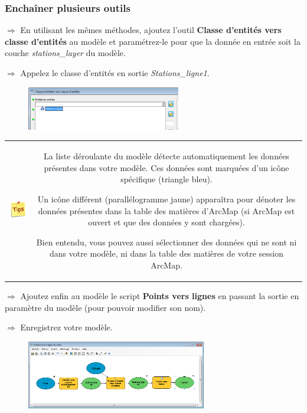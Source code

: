 \documentclass[11pt]{article}
\newcommand{\action}{$\Rightarrow$ }
\newenvironment{note}{%
	\begin{tabular}[t t]{c c}
		\includegraphics{img/tips.png}
		 &
		\begin{minipage}[c]{0.9\linewidth}
			\begin{sffamily}
}{%
			\end{sffamily}
		\end{minipage}
	\end{tabular}	
}
\begin{document}
\subsubsection{Enchaîner plusieurs outils}
\action En utilisant les mêmes méthodes, ajoutez l'outil \textbf{Classe d'entités vers classe d'entités} au modèle et paramétrez-le pour que la donnée en entrée soit la couche \textit{stations\_layer} du modèle.

\action Appelez le classe d'entités en sortie \textit{Stations\_ligne1}.

\begin{figure}[H]
	\center \includegraphics[width=0.6\textwidth]{img/td3/modelbuilder_creation-4.png}\\
\end{figure}

\begin{note}
La liste déroulante du modèle détecte automatiquement les données présentes dans votre modèle. Ces données sont marquées d'un icône spécifique (triangle bleu). 

Un icône différent (parallélogramme jaune) apparaîtra pour dénoter les données présentes dans la table des matières d'ArcMap (si ArcMap est ouvert et que des données y sont chargées). 

Bien entendu, vous pouvez aussi sélectionner des données qui ne sont ni dans votre modèle, ni dans la table des matières de votre session ArcMap.
\end{note}

\action Ajoutez enfin au modèle le script \textbf{Points vers lignes} en passant la sortie en paramètre du modèle (pour pouvoir modifier son nom).

\action Enregistrez votre modèle.
\begin{figure}[H]
	\center \includegraphics[width=0.7\textwidth]{img/td3/modelbuilder_creation-5.png}\\
\end{figure}
\end{document}
